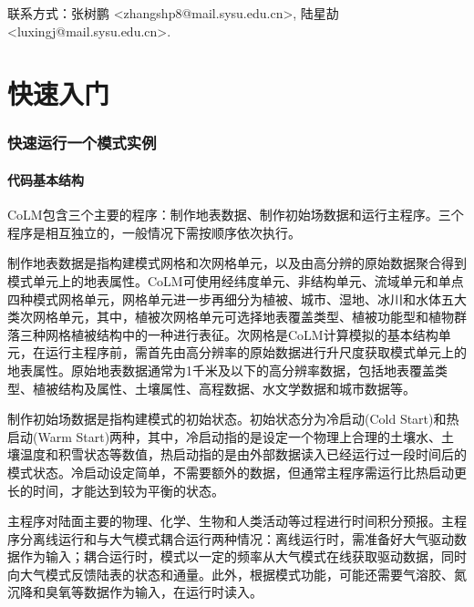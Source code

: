 \documentclass[a4paper,12pt,twoside]{article}
\begin{document}
联系方式：张树鹏 <zhangshp8@mail.sysu.edu.cn>, 陆星劼 <luxingj@mail.sysu.edu.cn>.

\clearpage

\part{快速入门}
\section{快速运行一个模式实例}\label{chapter01}

\subsection{代码基本结构}

CoLM包含三个主要的程序：制作地表数据、制作初始场数据和运行主程序。三个程序是相互独立的，一般情况下需按顺序依次执行。

制作地表数据是指构建模式网格和次网格单元，以及由高分辨的原始数据聚合得到模式单元上的地表属性。CoLM可使用经纬度单元、非结构单元、流域单元和单点四种模式网格单元，网格单元进一步再细分为植被、城市、湿地、冰川和水体五大类次网格单元，其中，植被次网格单元可选择地表覆盖类型、植被功能型和植物群落三种网格植被结构中的一种进行表征。次网格是CoLM计算模拟的基本结构单元，在运行主程序前，需首先由高分辨率的原始数据进行升尺度获取模式单元上的地表属性。原始地表数据通常为1千米及以下的高分辨率数据，包括地表覆盖类型、植被结构及属性、土壤属性、高程数据、水文学数据和城市数据等。

制作初始场数据是指构建模式的初始状态。初始状态分为冷启动(Cold Start)和热启动(Warm Start)两种，其中，冷启动指的是设定一个物理上合理的土壤水、土壤温度和积雪状态等数值，热启动指的是由外部数据读入已经运行过一段时间后的模式状态。冷启动设定简单，不需要额外的数据，但通常主程序需运行比热启动更长的时间，才能达到较为平衡的状态。

主程序对陆面主要的物理、化学、生物和人类活动等过程进行时间积分预报。主程序分离线运行和与大气模式耦合运行两种情况：离线运行时，需准备好大气驱动数据作为输入；耦合运行时，模式以一定的频率从大气模式在线获取驱动数据，同时向大气模式反馈陆表的状态和通量。此外，根据模式功能，可能还需要气溶胶、氮沉降和臭氧等数据作为输入，在运行时读入。
\end{document}
